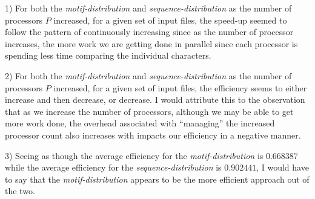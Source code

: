 \documentclass[executivepaper]{article}
\begin{document}
\begin{flushleft}

1) For both the \textit{motif-distribution} and \textit{sequence-distribution} as the number of processors $P$ increased, for a given set of input files, the speed-up seemed to follow the pattern of continuously increasing since as the number of processor increases, the more work we are getting done in parallel since each processor is spending less time comparing the individual characters.

\end{flushleft}

\begin{flushleft}

2) For both the \textit{motif-distribution} and \textit{sequence-distribution} as the number of processors $P$ increased, for a given set of input files, the efficiency seems to either increase and then decrease, or decrease. I would attribute this to the observation that as we increase the number of processors, although we may be able to get more work done, the overhead associated with ``managing'' the increased processor count also increases with impacts our efficiency in a negative manner.

\end{flushleft}

\begin{flushleft}

3) Seeing as though the average efficiency for the \textit{motif-distribution} is $0.668387$ while the average efficiency for the \textit{sequence-distribution} is $0.902441$, I would have to say that the \textit{motif-distribution} appears to be the more efficient approach out of the two.

\end{flushleft}
\end{document}
